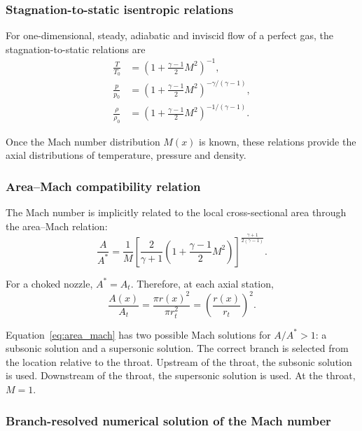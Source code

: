 \subsubsection{Stagnation-to-static isentropic relations}

For one-dimensional, steady, adiabatic and inviscid flow of a perfect gas, the stagnation-to-static relations are
\begin{align}
\frac{T}{T_0} &= \left(1+\frac{\gamma-1}{2}M^2\right)^{-1},
\label{eq:T_T0}\\
\frac{p}{p_0} &= \left(1+\frac{\gamma-1}{2}M^2\right)^{-\gamma/(\gamma-1)},
\label{eq:p_p0}\\
\frac{\rho}{\rho_0} &= \left(1+\frac{\gamma-1}{2}M^2\right)^{-1/(\gamma-1)}.
\label{eq:rho_rho0}
\end{align}

Once the Mach number distribution $M(x)$ is known, these relations provide the axial distributions of temperature, pressure and density.

\subsubsection{Area--Mach compatibility relation}

The Mach number is implicitly related to the local cross-sectional area through the area--Mach relation:
\begin{equation}
\frac{A}{A^*}=\frac{1}{M}
\left[
\frac{2}{\gamma+1}
\left(1+\frac{\gamma-1}{2}M^2\right)
\right]^{\frac{\gamma+1}{2(\gamma-1)}} .
\label{eq:area_mach}
\end{equation}

For a choked nozzle, $A^*=A_t$. Therefore, at each axial station,
\begin{equation}
\frac{A(x)}{A_t}=\frac{\pi r(x)^2}{\pi r_t^2}=\left(\frac{r(x)}{r_t}\right)^2 .
\label{eq:area_ratio_local}
\end{equation}

Equation~\eqref{eq:area_mach} has two possible Mach solutions for $A/A^*>1$: a subsonic solution and a supersonic solution. The correct branch is selected from the location relative to the throat. Upstream of the throat, the subsonic solution is used. Downstream of the throat, the supersonic solution is used. At the throat, $M=1$.

\subsubsection{Branch-resolved numerical solution of the Mach number}

